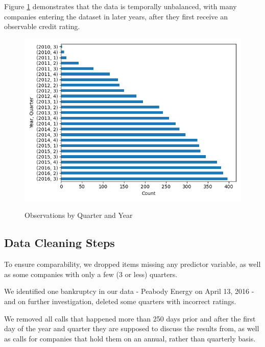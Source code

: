 \documentclass{article}[11pt]
\begin{document}
    Figure \ref{fig:obs-by-quarter-year} demonstrates that the data is temporally unbalanced, with many companies entering the dataset in later years, after they first receive an observable credit rating.

    \begin{figure}[h!]
		\centering
        \caption{Observations by Quarter and Year}
        \includegraphics[width=0.6\linewidth,keepaspectratio=true]{../Output/All Data EDA/Tabular EDA/all_data_fixed_quarter_dates_obs_by_year_quarter_no_title.png}
        \label{fig:obs-by-quarter-year}
	\end{figure}

    \clearpage
    \newpage

    \subsection{Data Cleaning Steps}

    \label{sec:data-cleaning}

    To ensure comparability, we dropped items missing any predictor variable, as well as some companies with only a few (3 or less) quarters. 
    
    We identified one bankruptcy in our data - Peabody Energy on April 13, 2016 - and on further investigation, deleted some quarters with incorrect ratings. 
    
    We removed all calls that happened more than 250 days prior and after the first day of the year and quarter they are supposed to discuss the results from, as well as calls for companies that hold them on an annual, rather than quarterly basis.
\end{document}
